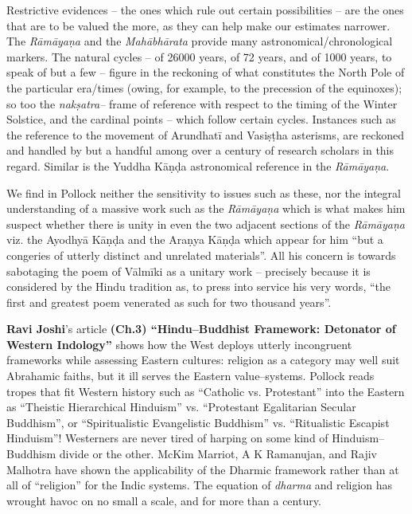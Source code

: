 Restrictive evidences – the ones which rule out certain possibilities – are the ones that are to be valued the more, as they can help make our estimates narrower. The \textit{Rāmāyaṇa} and the \textit{Mahābhārata} provide many astronomical/chronological markers. The natural cycles – of 26000 years, of 72 years, and of 1000 years, to speak of but a few – figure in the reckoning of what constitutes the North Pole of the particular era/times (owing, for example, to the precession of the equinoxes); so too the \textit{nakṣatra–} frame of reference with respect to the timing of the Winter Solstice, and the cardinal points – which follow certain cycles. Instances such as the reference to the movement of Arundhatī and Vasiṣṭha asterisms, are reckoned and handled by but a handful among over a century of research scholars in this regard. Similar is the Yuddha Kāṇḍa astronomical reference in the \textit{Rāmāyaṇa}.

We find in Pollock neither the sensitivity to issues such as these, nor the integral understanding of a massive work such as the \textit{Rāmāyaṇa} which is what makes him suspect whether there is unity in even the two adjacent sections of the \textit{Rāmāyaṇa} viz. the Ayodhyā Kāṇḍa and the Araṇya Kāṇḍa which appear for him “but a congeries of utterly distinct and unrelated materials”. All his concern is towards sabotaging the poem of Vālmīki as a unitary work – precisely because it is considered by the Hindu tradition as, to press into service his very words, “the first and greatest poem venerated as such for two thousand years”.

\textbf{Ravi Joshi}’s article \textbf{(Ch.3) “Hindu–Buddhist Framework: Detonator of Western Indology”} shows how the West deploys utterly incongruent frameworks while assessing Eastern cultures: religion as a category may well suit Abrahamic faiths, but it ill serves the Eastern value–systems. Pollock reads tropes that fit Western history such as “Catholic vs. Protestant” into the Eastern as “Theistic Hierarchical Hinduism'' vs. ``Protestant Egalitarian Secular Buddhism”, or “Spiritualistic Evangelistic Buddhism” vs. “Ritualistic Escapist Hinduism''! Westerners are never tired of harping on some kind of Hinduism–Buddhism divide or the other. McKim Marriot, A K Ramanujan, and Rajiv Malhotra have shown the applicability of the Dharmic framework rather than at all of “religion” for the Indic systems. The equation of \textit{dharma} and religion has wrought havoc on no small a scale, and for more than a century.

